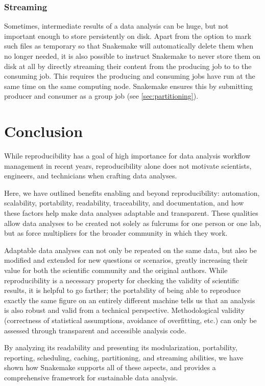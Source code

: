 \documentclass[parskip=half]{scrartcl}
\begin{document}
\subsubsection{Streaming}\label{sec:streaming}

Sometimes, intermediate results of a data analysis can be huge, but not important enough to store persistently on disk.
Apart from the option to mark such files as temporary so that Snakemake will automatically delete them when no longer needed, it is also possible to instruct Snakemake to never store them on disk at all by directly streaming their content from the producing job to to the consuming job.
This requires the producing and consuming jobs have run at the same time on the same computing node.
Snakemake ensures this by submitting producer and consumer as a group job (see \autoref{sec:partitioning}).

\section{Conclusion}

While reproducibility has a goal of high importance for data analysis workflow management in recent years, reproducibility alone does not motivate scientists, engineers, and technicians when crafting data analyses.

Here, we have outlined benefits enabling and beyond reproducibility: automation, scalability, portability, readability, traceability, and documentation, and how these factors help make data analyses adaptable and transparent. These qualities allow data analyses to be created not solely as fulcrums for one person or one lab, but as force multipliers for the broader community in which they work.

Adaptable data analyses can not only be repeated on the same data, but also be modified and extended for new questions or scenarios, greatly increasing their value for both the scientific community and the original authors.
While reproducibility is a necessary property for checking the validity of scientific results, it is helpful to go farther; the portability of being able to reproduce exactly the same figure on an entirely different machine tells us that an analysis is also robust and valid from a technical perspective. Methodological validity (correctness of statistical assumptions, avoidance of overfitting, etc.) can only be assessed through transparent and accessible analysis code.

By analyzing its readability and presenting its modularization, portability, reporting, scheduling, caching, partitioning, and streaming abilities, we have shown how Snakemake supports all of these aspects, and provides a comprehensive framework for sustainable data analysis.
\end{document}
